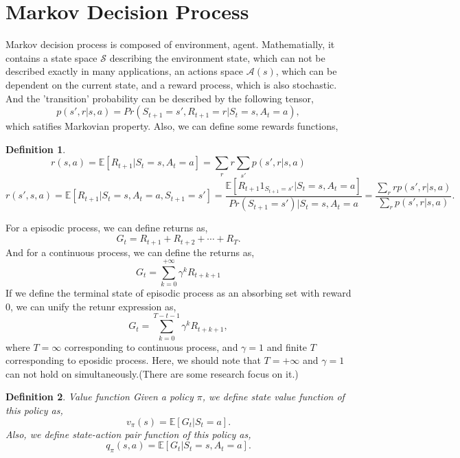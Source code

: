\documentclass[11pt,a4paper]{article}
\def\S{{\mathcal S}}
\def\A{{\mathcal A}}
\def\E{\mathbb{E}}
\newtheorem{definition}{Definition}[subsection]
\begin{document}
\section{Markov Decision Process}
Markov decision process is composed of environment, agent. Mathematially, it contains a state space $\S$ describing the environment state, which can not be described exactly in many applications, an actions space $\A(s)$, which can be dependent on the current state, and a reward process, which is also stochastic. And the 'transition' probability can be described by the following tensor,
\begin{equation}
p(s',r|s,a) = Pr(S_{t+1}=s',R_{t+1}=r|S_t= s, A_t= a),
\end{equation}
which satifies Markovian property. Also, we can define some rewards functions,
\begin{definition}
\begin{equation}
r(s,a) = \E[R_{t+1}|S_t = s, A_t = a] = \sum_{r}r\sum_{s'}p(s',r|s,a)
\end{equation}
\begin{equation}
r(s',s,a) = \E[R_{t+1}|S_t=s,A_t=a,S_{t+1}=s'] = \frac{\E[R_{t+1}1_{S_{t+1}=s'}|S_t=s,A_t=a]}{Pr(S_{t+1}=s')|S_t=s,A_t=a} = \frac{\sum_{r}rp(s',r|s,a)}{\sum_{r}p(s',r|s,a)}.
\end{equation}
\end{definition}
For a episodic process, we can define returns as,
\begin{equation}
G_t = R_{t+1} + R_{t+2} + \cdots + R_T.
\end{equation}
And for a continuous process, we can define the returns as,
\begin{equation}
G_t = \sum_{k=0}^{+\infty}\gamma^kR_{t+k+1}
\end{equation}
If we define the terminal state of episodic process as an absorbing set with reward 0, we can unify the retunr expression as,
\begin{equation}
G_t = \sum_{k=0}^{T-t-1}\gamma^k R_{t+k+1},
\end{equation}
where $T = \infty$ corresponding to continuous process, and $\gamma = 1$ and finite $T$ corresponding to eposidic process. Here, we should note that $T = +\infty$ and $\gamma = 1$ can not hold on simultaneously.(There are some research focus on it.)

\begin{definition}{Value function}
Given a policy $\pi$, we define state value function of this policy as,
\begin{equation}
v_{\pi}(s) = \E[G_t |S_t = a].
\end{equation}
Also, we define state-action pair function of this policy as,
\begin{equation}
q_{\pi}(s,a) = \E[G_t|S_t=s,A_t= a].
\end{equation}
\end{definition}
\end{document}
